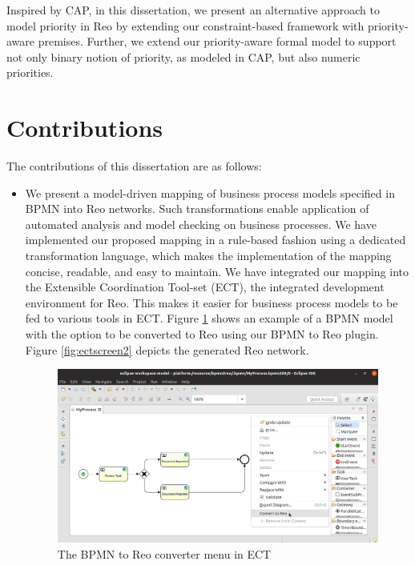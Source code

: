 Inspired by CAP, in this dissertation, we present an alternative approach to model priority in Reo by extending our constraint-based framework with priority-aware premises. Further, we extend our priority-aware formal model to support not only binary notion of priority, as modeled in CAP, but also numeric priorities. %

\section{Contributions}

The contributions of this dissertation are as follows:

\begin{itemize}
\item We present a model-driven mapping of business process models specified in BPMN into Reo networks. Such transformations enable application of automated analysis and model checking on business processes. We have implemented our proposed mapping in a rule-based fashion using a dedicated transformation language, which makes the implementation of the mapping concise, readable, and easy to maintain. We have integrated our mapping into the Extensible Coordination Tool-set (ECT), the integrated development environment for Reo. This makes it easier for business process models to be fed to various tools in ECT. Figure \ref{fig:ectscreen} shows an example of a BPMN model with the option to be converted to Reo using our BPMN to Reo plugin. Figure \ref{fig:ectscreen2} depicts the generated Reo network.

\begin{figure}[!t]
\includegraphics[width=.9\textwidth]{img/ectlast}
\caption{The BPMN to Reo converter menu in ECT}
\label{fig:ectscreen}
\end{figure}



\end{itemize}
